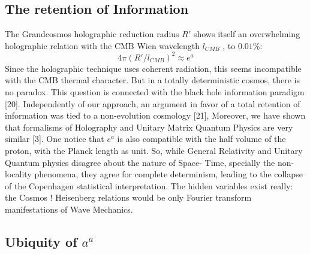 \documentclass[twoside,draft]{article}
\begin{document}
{\subsection{The retention of Information}

The Grandcosmos holographic reduction radius $R\prime$ shows itself an overwhelming holographic
relation with the CMB Wien wavelength $l_{CMB}$ , to $0.01\%$:
$$4\pi(R\prime/l_{CMB})^{2} \approx e^{a}$$
Since the holographic technique uses coherent radiation, this seems incompatible with the CMB
thermal character. But in a totally deterministic cosmos, there is no paradox. This question is
connected with the black hole information paradigm [20]. Independently of our approach, an
argument in favor of a total retention of information was tied to a non-evolution cosmology
[21], Moreover, we have shown that formalisms of Holography and Unitary Matrix Quantum
Physics are very similar [3]. One notice that $e^{a}$ is also compatible with the half volume of the proton, with
the Planck length as unit.
So, while General Relativity and Unitary Quantum physics disagree about the nature of Space-
Time, specially the non-locality phenomena, they agree for complete determinism, leading to the collapse of the
Copenhagen statistical interpretation. The hidden variables exist really: the Cosmos ! Heisenberg
relations would be only Fourier transform manifestations of Wave Mechanics.

\subsection{Ubiquity of $a^{a}$}

}
\end{document}
